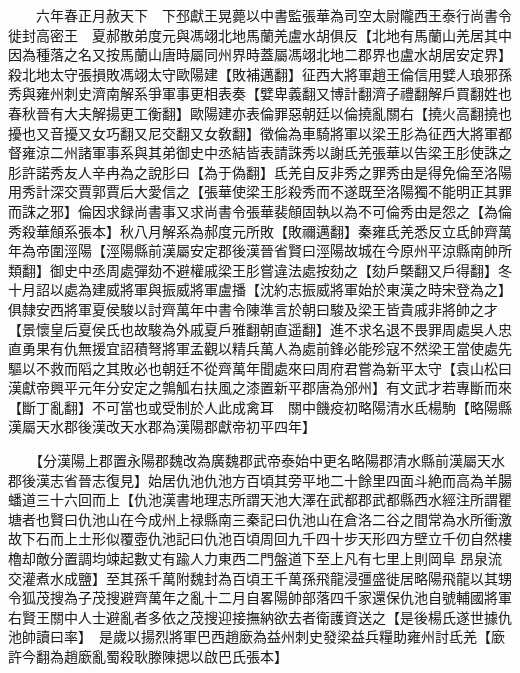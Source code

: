 　　六年春正月赦天下　下邳獻王晃薨以中書監張華為司空太尉隴西王泰行尚書令徙封高密王　夏郝散弟度元與馮翊北地馬蘭羌盧水胡俱反【北地有馬蘭山羌居其中因為種落之名又按馬蘭山唐時屬同州界時蓋屬馮翊北地二郡界也盧水胡居安定界】殺北地太守張損敗馮翊太守歐陽建【敗補邁翻】征西大將軍趙王倫信用嬖人琅邪孫秀與雍州刺史濟南解系爭軍事更相表奏【嬖卑義翻又博計翻濟子禮翻解戶買翻姓也春秋晉有大夫解揚更工衡翻】歐陽建亦表倫罪惡朝廷以倫撓亂關右【撓火高翻撓也擾也又音擾又女巧翻又尼交翻又女敎翻】徵倫為車騎將軍以梁王肜為征西大將軍都督雍涼二州諸軍事系與其弟御史中丞結皆表請誅秀以謝氐羌張華以告梁王肜使誅之肜許諾秀友人辛冉為之說肜曰【為于偽翻】氐羌自反非秀之罪秀由是得免倫至洛陽用秀計深交賈郭賈后大愛信之【張華使梁王肜殺秀而不遂既至洛陽獨不能明正其罪而誅之邪】倫因求録尚書事又求尚書令張華裴頠固執以為不可倫秀由是怨之【為倫秀殺華頠系張本】秋八月解系為郝度元所敗【敗禰邁翻】秦雍氐羌悉反立氐帥齊萬年為帝圍涇陽【涇陽縣前漢屬安定郡後漢晉省賢曰涇陽故城在今原州平涼縣南帥所類翻】御史中丞周處彈劾不避權戚梁王肜嘗違法處按劾之【劾戶槩翻又戶得翻】冬十月詔以處為建威將軍與振威將軍盧播【沈約志振威將軍始於東漢之時宋登為之】俱隸安西將軍夏侯駿以討齊萬年中書令陳準言於朝曰駿及梁王皆貴戚非將帥之才【景懷皇后夏侯氏也故駿為外戚夏戶雅翻朝直遥翻】進不求名退不畏罪周處吳人忠直勇果有仇無援宜詔積弩將軍孟觀以精兵萬人為處前鋒必能殄寇不然梁王當使處先驅以不救而䧟之其敗必也朝廷不從齊萬年聞處來曰周府君嘗為新平太守【袁山松曰漢獻帝興平元年分安定之鶉觚右扶風之漆置新平郡唐為邠州】有文武才若專斷而來【斷丁亂翻】不可當也或受制於人此成禽耳　關中饑疫初略陽清水氐楊駒【略陽縣漢屬天水郡後漢改天水郡為漢陽郡獻帝初平四年】

　　【分漢陽上郡置永陽郡魏改為廣魏郡武帝泰始中更名略陽郡清水縣前漢屬天水郡後漢志省晉志復見】始居仇池仇池方百頃其旁平地二十餘里四面斗絶而高為羊腸蟠道三十六回而上【仇池漢書地理志所謂天池大澤在武都郡武都縣西水經注所謂瞿塘者也賢曰仇池山在今成州上禄縣南三秦記曰仇池山在倉洛二谷之間常為水所衝激故下石而上土形似覆壺仇池記曰仇池百頃周回九千四十步天形四方壁立千仞自然樓櫓却敵分置調均竦起數丈有踰人力東西二門盤道下至上凡有七里上則岡阜昂泉流交灌煮水成鹽】至其孫千萬附魏封為百頃王千萬孫飛龍浸彊盛徙居略陽飛龍以其甥令狐茂搜為子茂搜避齊萬年之亂十二月自畧陽帥部落四千家還保仇池自號輔國將軍右賢王關中人士避亂者多依之茂搜迎接撫納欲去者衛護資送之【是後楊氏遂世據仇池帥讀曰率】　是歲以揚烈將軍巴西趙廞為益州刺史發梁益兵糧助雍州討氐羌【廞許今翻為趙廞亂蜀殺耿滕陳揌以啟巴氏張本】

